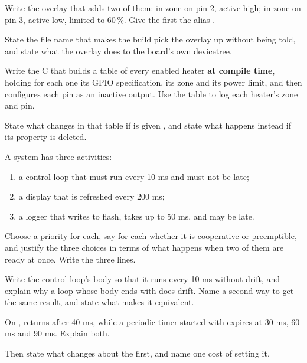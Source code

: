  Write the overlay that adds two of them:  in zone  on
 pin 2, active high;  in zone  on  pin 3, active
low, limited to 60\,\%. Give the first the alias .

State the file name that makes the build pick the overlay up without being told, and state what the
overlay does to the board's own devicetree. 

 Write the C that builds a table of every enabled heater \textbf{at compile time}, holding
for each one its GPIO specification, its zone and its power limit, and then configures each pin as
an inactive output. Use the table to log each heater's zone and pin.

State what changes in that table if  is given , and state
what happens instead if its  property is deleted. 

\label{exb:q:4}
A system has three activities:
\begin{enumerate}
  \item a control loop that must run every 10 ms and must not be late;
  \item a display that is refreshed every 200 ms;
  \item a logger that writes to flash, takes up to 50 ms, and may be late.
\end{enumerate}

 Choose a priority for each, say for each whether it is cooperative or preemptible, and
justify the three choices in terms of what happens when two of them are ready at once. Write the
three  lines. 

 Write the control loop's body so that it runs every 10 ms without drift, and explain why a
loop whose body ends with  does drift. Name a second way to get the same result,
and state what makes it equivalent. 

 On ,  returns after 40 ms, while a periodic timer
started with  expires at 30 ms, 60 ms and 90 ms.
Explain both.

Then state what  changes about the first, and name one
cost of setting it. 

